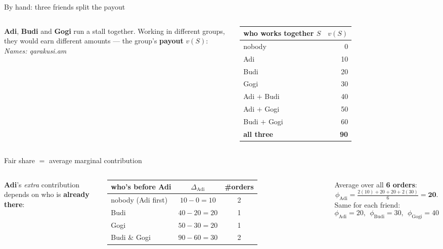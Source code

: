 \documentclass[aspectratio=169]{beamer}
\begin{document}
\begin{frame}{By hand: three friends split the payout}
  \begin{columns}[T]
    \textbf{Adi}, \textbf{Budi} and \textbf{Gogi} run a stall together. Working in different groups,
    they would earn different amounts --- the group's \textbf{payout} $v(S)$:
    \vskip 6pt
    \vskip 6pt
    {\footnotesize \textit{Names: qarakusi.am}}
    \centering\small
    \renewcommand{\arraystretch}{1.12}
    \begin{tabular}{l r}
      \textbf{who works together} $S$ & $v(S)$ \\
      \hline
      nobody & 0 \\
      Adi & 10 \\
      Budi & 20 \\
      Gogi & 30 \\
      Adi $+$ Budi & 40 \\
      Adi $+$ Gogi & 50 \\
      Budi $+$ Gogi & 60 \\
      \textbf{all three} & \textbf{90} \\
      \hline
    \end{tabular}
  \end{columns}
\end{frame}

\begin{frame}{Fair share $=$ average marginal contribution}
  \begin{columns}[T]
    \textbf{Adi}'s \emph{extra} contribution depends on who is \textbf{already there}:
    \vskip 3pt
    {\footnotesize
    \renewcommand{\arraystretch}{1.15}
    \begin{tabular}{l c c}
      who's before Adi & $\Delta_{\text{Adi}}$ & \#orders \\
      \hline
      nobody (Adi first) & $10-0 = 10$ & 2 \\
      Budi & $40-20 = 20$ & 1 \\
      Gogi & $50-30 = 20$ & 1 \\
      Budi \& Gogi & $90-60 = 30$ & 2 \\
      \hline
    \end{tabular}}
    \vskip 4pt
    Average over all \textbf{6 orders}:
    \[ \phi_{\text{Adi}} = \tfrac{2(10)+20+20+2(30)}{6} = \mathbf{20}. \]
    Same for each friend:
    \[ \phi_{\text{Adi}}{=}20,\ \ \phi_{\text{Budi}}{=}30,\ \ \phi_{\text{Gogi}}{=}40 \]
    \vskip 4pt
  \end{columns}
\end{frame}
\end{document}
